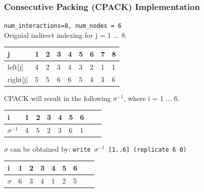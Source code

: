 \documentclass{beamer}
\begin{document}
\begin{frame}[fragile,t]
  \frametitle{Consecutive Packing (CPACK) Implementation}

{\tt num\_interactions=8, num\_nodes = 6}\\
Orignial indirect indexing for j = 1 $\ldots$ 8.\smallskip
 
\begin{tabular}{ | l | l | l | l | l | l | l | l | l |}
  j       & 1 & 2 & 3 & 4 & 5 & 6 & 7 & 8\\\hline
  left[j] & 4 & 2 & 3 & 4 & 3 & 2 & 1 & 1\\
  right[j]& 5 & 5 & 6 & 6 & 5 & 4 & 3 & 6\\\hline
\end{tabular}
\bigskip

CPACK will result in the following $\sigma^{-1}$, where i = 1 $\ldots$ 6.\pause\smallskip

\begin{tabular}{ | l | l | l | l | l | l | l | l | l |}
  i             & 1 & 2 & 3 & 4 & 5 & 6\\\hline
  $\sigma^{-1}$ & 4 & 5 & 2 & 3 & 6 & 1\\\hline
\end{tabular}

\bigskip

$\sigma$ can be obtained by: {\tt write $\sigma^{-1}$ [1..6] (replicate 6 0)}\\\pause\smallskip

\begin{tabular}{ | l | l | l | l | l | l | l | l | l |}
  i         & 1 & 2 & 3 & 4 & 5 & 6\\\hline
  $\sigma $ & 6 & 3 & 4 & 1 & 2 & 5\\\hline
\end{tabular}

\end{frame}
\end{document}
